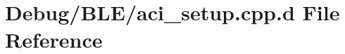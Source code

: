 \hypertarget{_debug_2_b_l_e_2aci__setup_8cpp_8d}{\section{\-Debug/\-B\-L\-E/aci\-\_\-setup.cpp.\-d \-File \-Reference}
\label{_debug_2_b_l_e_2aci__setup_8cpp_8d}
}
